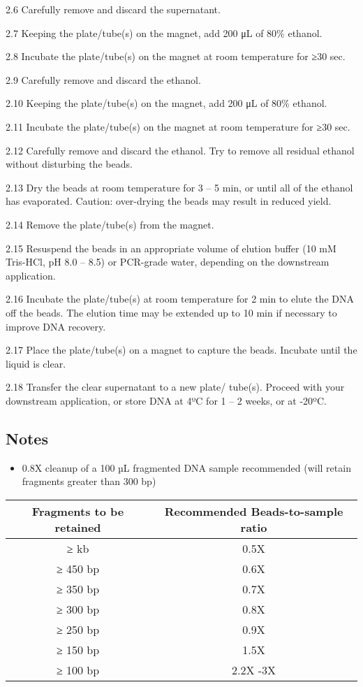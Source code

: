 \documentclass[
  letterpaper,
  DIV=11,
  numbers=noendperiod]{scrreprt}
\providecommand{\tightlist}{%
  \setlength{\itemsep}{0pt}\setlength{\parskip}{0pt}}\usepackage{longtable,booktabs,array}
\begin{document}
2.6 Carefully remove and discard the supernatant.

2.7 Keeping the plate/tube(s) on the magnet, add 200 μL of 80\% ethanol.

2.8 Incubate the plate/tube(s) on the magnet at room temperature for ≥30
sec.

2.9 Carefully remove and discard the ethanol.

2.10 Keeping the plate/tube(s) on the magnet, add 200 μL of 80\%
ethanol.

2.11 Incubate the plate/tube(s) on the magnet at room temperature for
≥30 sec.

2.12 Carefully remove and discard the ethanol. Try to remove all
residual ethanol without disturbing the beads.

2.13 Dry the beads at room temperature for 3 -- 5 min, or until all of
the ethanol has evaporated. Caution: over-drying the beads may result in
reduced yield.

2.14 Remove the plate/tube(s) from the magnet.

2.15 Resuspend the beads in an appropriate volume of elution buffer (10
mM Tris-HCl, pH 8.0 -- 8.5) or PCR-grade water, depending on the
downstream application.

2.16 Incubate the plate/tube(s) at room temperature for 2 min to elute
the DNA off the beads. The elution time may be extended up to 10 min if
necessary to improve DNA recovery.

2.17 Place the plate/tube(s) on a magnet to capture the beads. Incubate
until the liquid is clear.

2.18 Transfer the clear supernatant to a new plate/ tube(s). Proceed
with your downstream application, or store DNA at 4ºC for 1 -- 2 weeks,
or at -20ºC.

\hypertarget{notes-1}{%
\subsection*{\texorpdfstring{\textbf{Notes}}{Notes}}\label{notes-1}}

\begin{itemize}
\tightlist
\item
  0.8X cleanup of a 100 µL fragmented DNA sample recommended (will
  retain fragments greater than 300 bp)
\end{itemize}

\begin{longtable}[]{@{}cc@{}}
\toprule()
\textbf{Fragments to be retained} & \textbf{Recommended Beads-to-sample
ratio} \\
\midrule()
\endhead
≥ kb & 0.5X \\
≥ 450 bp & 0.6X \\
≥ 350 bp & 0.7X \\
≥ 300 bp & 0.8X \\
≥ 250 bp & 0.9X \\
≥ 150 bp & 1.5X \\
≥ 100 bp & 2.2X -3X \\
\bottomrule()
\end{longtable}
\end{document}
